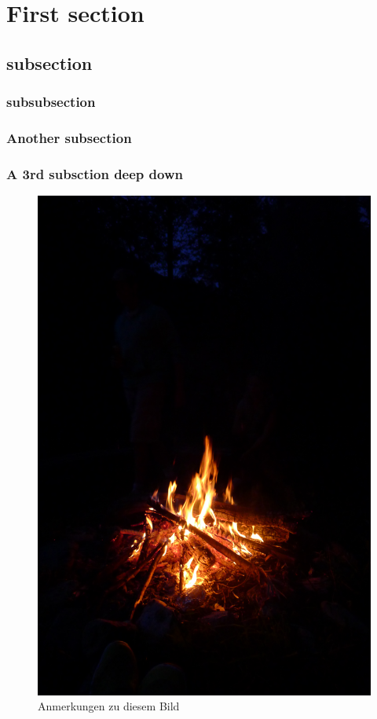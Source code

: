 \documentclass[fontsize=12pt,parskip=false,numbers=enddot]{scrartcl} %
\begin{document}
\thispagestyle{empty}
\quad
\newpage



\tableofcontents
\newpage

\listoffigures
\newpage
\listoftables

\newpage

{}

\section{First section}
\subsection{subsection}
\subsubsection{subsubsection}
\lipsum[1-1]
\subsubsection{Another subsection}
\lipsum[1-1]
\subsubsection{A 3rd subsction deep down}
\lipsum[1-1]

\begin{figure}[!h]
\centering
{}
\includegraphics[width=.5\textwidth]{p1}
\\
Anmerkungen zu diesem Bild

\end{figure}
\end{document}
